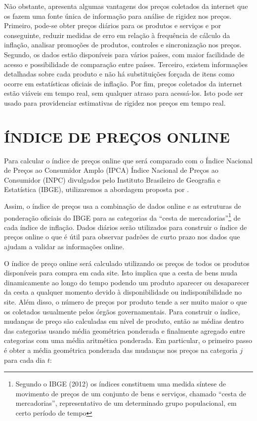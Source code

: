 \documentclass[twoside,a4paper,11pt]{report}
\begin{document}
  Não obstante, \citet{cavallo2010scraped} apresenta algumas vantagens dos preços coletados da internet que os fazem uma fonte única de informação para análise de rigidez nos preços. Primeiro, pode-se obter preços diários para os produtos e serviços e por conseguinte, reduzir medidas de erro em relação à frequência de cálculo da inflação, analisar promoções de produtos, controles e sincronização nos preços. Segundo, os dados estão disponíveis para vários países, com maior facilidade de acesso e possibilidade de comparação entre países. Terceiro, existem informações detalhadas sobre cada produto e não há substituições forçada de itens como ocorre em estatísticas oficiais de inflação. Por fim, preços coletados da internet estão viáveis em tempo real, sem qualquer atraso para acessá-los. Isto pode ser usado para providenciar estimativas de rigidez nos preços em tempo real.
  
\section*{ÍNDICE DE PREÇOS ONLINE}
  
  Para calcular o índice de preços online que será comparado com o Índice Nacional de Preços ao Consumidor Amplo (IPCA) Índice Nacional de Preços ao Consumidor (INPC) divulgados pelo Instituto Brasileiro de Geografia e Estatística (IBGE), utilizaremos a abordagem proposta por \citet{cavallo2010scraped}.
  
  Assim, o índice de preços usa a combinação de dados online e as estruturas de ponderação oficiais do IBGE para as categorias da “cesta de mercadorias”\footnote[1]{Segundo o IBGE (2012) os índices constituem uma medida síntese de movimento de preços de um conjunto de bens e serviços, chamado “cesta de mercadorias”, representativo de um determinado grupo populacional, em certo período de tempo} de cada índice de inflação. Dados diários serão utilizados para construir o índice de preços online o que é útil para observar padrões de curto prazo nos dados que ajudam a validar as informações online. 
  
  O índice de preço online será calculado utilizando os preços de todos os produtos disponíveis para compra em cada site. Isto implica que a cesta de bens muda dinamicamente ao longo do tempo podendo um produto aparecer ou desaparecer da cesta a qualquer momento devido à disponibilidade ou indisponibilidade no site. Além disso, o número de preços por produto tende a ser muito maior o que os coletados usualmente pelos órgãos governamentais. 
Para construir o índice, mudanças de preço são calculadas em nível de produto, então as médias dentro das categorias usando média geométrica ponderada e finalmente agregado entre categorias com uma média aritmética ponderada. Em particular, o primeiro passo é obter a média geométrica ponderada das mudanças nos preços na categoria $j$ para cada dia $t$:
\end{document}
